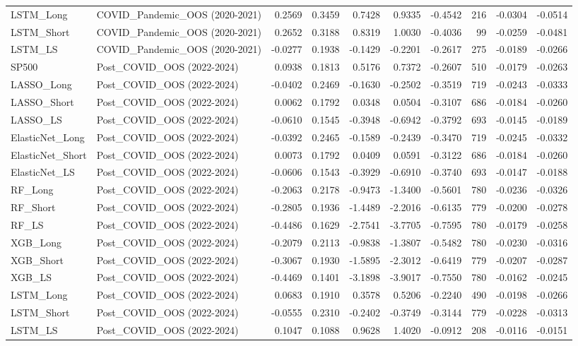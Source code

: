 \begin{tabular}{llrrrrrrrr}
\cline{1-10}
LSTM\_Long & COVID\_Pandemic\_OOS (2020-2021) & 0.2569 & 0.3459 & 0.7428 & 0.9335 & -0.4542 & 216 & -0.0304 & -0.0514 \\
\cline{1-10}
LSTM\_Short & COVID\_Pandemic\_OOS (2020-2021) & 0.2652 & 0.3188 & 0.8319 & 1.0030 & -0.4036 & 99 & -0.0259 & -0.0481 \\
\cline{1-10}
LSTM\_LS & COVID\_Pandemic\_OOS (2020-2021) & -0.0277 & 0.1938 & -0.1429 & -0.2201 & -0.2617 & 275 & -0.0189 & -0.0266 \\
\cline{1-10}
SP500 & Post\_COVID\_OOS (2022-2024) & 0.0938 & 0.1813 & 0.5176 & 0.7372 & -0.2607 & 510 & -0.0179 & -0.0263 \\
\cline{1-10}
LASSO\_Long & Post\_COVID\_OOS (2022-2024) & -0.0402 & 0.2469 & -0.1630 & -0.2502 & -0.3519 & 719 & -0.0243 & -0.0333 \\
\cline{1-10}
LASSO\_Short & Post\_COVID\_OOS (2022-2024) & 0.0062 & 0.1792 & 0.0348 & 0.0504 & -0.3107 & 686 & -0.0184 & -0.0260 \\
\cline{1-10}
LASSO\_LS & Post\_COVID\_OOS (2022-2024) & -0.0610 & 0.1545 & -0.3948 & -0.6942 & -0.3792 & 693 & -0.0145 & -0.0189 \\
\cline{1-10}
ElasticNet\_Long & Post\_COVID\_OOS (2022-2024) & -0.0392 & 0.2465 & -0.1589 & -0.2439 & -0.3470 & 719 & -0.0245 & -0.0332 \\
\cline{1-10}
ElasticNet\_Short & Post\_COVID\_OOS (2022-2024) & 0.0073 & 0.1792 & 0.0409 & 0.0591 & -0.3122 & 686 & -0.0184 & -0.0260 \\
\cline{1-10}
ElasticNet\_LS & Post\_COVID\_OOS (2022-2024) & -0.0606 & 0.1543 & -0.3929 & -0.6910 & -0.3740 & 693 & -0.0147 & -0.0188 \\
\cline{1-10}
RF\_Long & Post\_COVID\_OOS (2022-2024) & -0.2063 & 0.2178 & -0.9473 & -1.3400 & -0.5601 & 780 & -0.0236 & -0.0326 \\
\cline{1-10}
RF\_Short & Post\_COVID\_OOS (2022-2024) & -0.2805 & 0.1936 & -1.4489 & -2.2016 & -0.6135 & 779 & -0.0200 & -0.0278 \\
\cline{1-10}
RF\_LS & Post\_COVID\_OOS (2022-2024) & -0.4486 & 0.1629 & -2.7541 & -3.7705 & -0.7595 & 780 & -0.0179 & -0.0258 \\
\cline{1-10}
XGB\_Long & Post\_COVID\_OOS (2022-2024) & -0.2079 & 0.2113 & -0.9838 & -1.3807 & -0.5482 & 780 & -0.0230 & -0.0316 \\
\cline{1-10}
XGB\_Short & Post\_COVID\_OOS (2022-2024) & -0.3067 & 0.1930 & -1.5895 & -2.3012 & -0.6419 & 779 & -0.0207 & -0.0287 \\
\cline{1-10}
XGB\_LS & Post\_COVID\_OOS (2022-2024) & -0.4469 & 0.1401 & -3.1898 & -3.9017 & -0.7550 & 780 & -0.0162 & -0.0245 \\
\cline{1-10}
LSTM\_Long & Post\_COVID\_OOS (2022-2024) & 0.0683 & 0.1910 & 0.3578 & 0.5206 & -0.2240 & 490 & -0.0198 & -0.0266 \\
\cline{1-10}
LSTM\_Short & Post\_COVID\_OOS (2022-2024) & -0.0555 & 0.2310 & -0.2402 & -0.3749 & -0.3144 & 779 & -0.0228 & -0.0313 \\
\cline{1-10}
LSTM\_LS & Post\_COVID\_OOS (2022-2024) & 0.1047 & 0.1088 & 0.9628 & 1.4020 & -0.0912 & 208 & -0.0116 & -0.0151 \\
\cline{1-10}
\bottomrule
\end{tabular}
